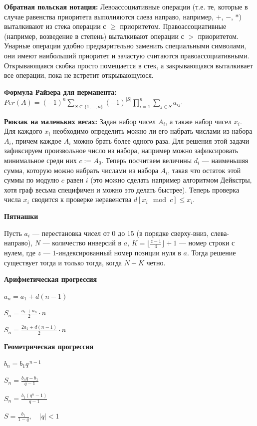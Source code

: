 \textbf{Обратная польская нотация:}
Левоассоциативные операции (т.е. те, которые в случае равенства приоритета выполняются слева направо, например, $+$, $-$, $*$)
выталкивают из стека операции с $\geq$ приоритетом. Правоассоциативные (например, возведение в степень) выталкивают операции
с $>$ приоритетом. Унарные операции удобно предварительно заменить специальными символами, они имеют наибольший приоритет и
зачастую считаются правоассоциативными. Открывающаяся скобка просто помещается в стек, а закрывающаяся выталкивает все
операции, пока не встретит открывающуюся.

\textbf{Формула Райзера для перманента:}
$Per(A)=(-1)^n\sum\limits_{S\subseteq \{1, \ldots , n\}}(-1)^{|S|}\prod\limits_{i=1}^n\sum\limits_{j\in S}a_{ij}$.

\textbf{Рюкзак на маленьких весах:}
Задан набор чисел $A_i$, а также набор чисел $x_i$. Для каждого $x_i$ необходимо определить можно ли его набрать числами из набора $A_i$, причем каждое $A_i$ можно брать
более одного раза. Для решения этой задачи зафиксируем произвольное число из набора, например можно зафиксировать минимальное среди них  $c := A_0$. Теперь посчитаем величины
$d_i$ --- наименьшяя сумма, которую можно набрать числами из набора $A_i$, такая что остаток этой суммы по модулю $c$ равен $i$ (это можно сделать например алгоритмом
Дейкстры, хотя граф весьма специфичен и можно это делать быстрее). Теперь проверка числа $x_i$ сводится к проверке неравенства $d[x_i \mod c] \le x_i$.

\textbf{Пятнашки}

Пусть $a_i$ --- перестановка чисел от $0$ до $15$ (в порядке сверху-вниз, слева-направо),
$N$ --- количество инверсий в $a$, $K = \lfloor\frac{z - 1}4\rfloor + 1$ --- номер строки с нулем,
где $z$ --- $1$-индексированный номер позиции нуля в $a$. Тогда решение существует тогда и только
тогда, когда $N + K$ четно.

\textbf{Арифметическая прогрессия}

$a_n = a_1 + d(n-1)$

$S_n = \frac{a_1 + a_n}{2} \cdot n$

$S_n = \frac{2a_1 + d(n-1)}{2} \cdot n$

\textbf{Геометрическая прогрессия}

$b_n = b_1 q^{\,n-1}$

$S_n = \frac{b_n q - b_1}{q-1}$

$S_n = \frac{b_1 (q^n - 1)}{q-1}$

$S = \frac{b_1}{1-q}, \quad |q| < 1$

